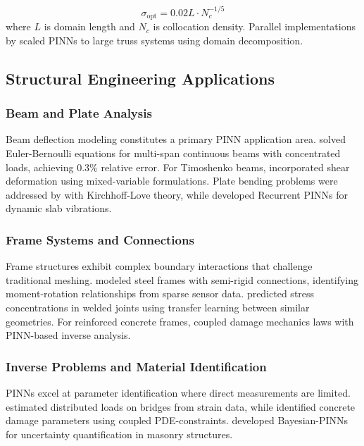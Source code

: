 \documentclass[twocolumn]{svjour3}
\begin{document}
	\begin{equation}
		\sigma_{\text{opt}} = 0.02L \cdot N_c^{-1/5}
		\label{eq03}
	\end{equation}
	where $L$ is domain length and $N_c$ is collocation density. Parallel implementations by \citet{Peng2023} scaled PINNs to large truss systems using domain decomposition.
	
	\subsection{Structural Engineering Applications}
	
	\subsubsection{Beam and Plate Analysis}
	Beam deflection modeling constitutes a primary PINN application area.\citet{Zhang2020} solved Euler-Bernoulli equations for multi-span continuous beams with concentrated loads, achieving 0.3\% relative error. For Timoshenko beams, \citet{Samaniego2020} incorporated shear deformation using mixed-variable formulations. Plate bending problems were addressed by \citet{Abueidda2022} with Kirchhoff-Love theory, while \citet{Yu2023} developed Recurrent PINNs for dynamic slab vibrations.
	
	\subsubsection{Frame Systems and Connections}
	Frame structures exhibit complex boundary interactions that challenge traditional meshing.\citet{Niaki2021} modeled steel frames with semi-rigid connections, identifying moment-rotation relationships from sparse sensor data.\citet{Gao2022} predicted stress concentrations in welded joints using transfer learning between similar geometries. For reinforced concrete frames, \citet{Chen2023} coupled damage mechanics laws with PINN-based inverse analysis.
	
	\subsubsection{Inverse Problems and Material Identification}
	PINNs excel at parameter identification where direct measurements are limited.\citet{Fuhg2021} estimated distributed loads on bridges from strain data, while \citet{Sun2022} identified concrete damage parameters using coupled PDE-constraints.\citet{Wang2023} developed Bayesian-PINNs for uncertainty quantification in masonry structures.
	
\end{document}
